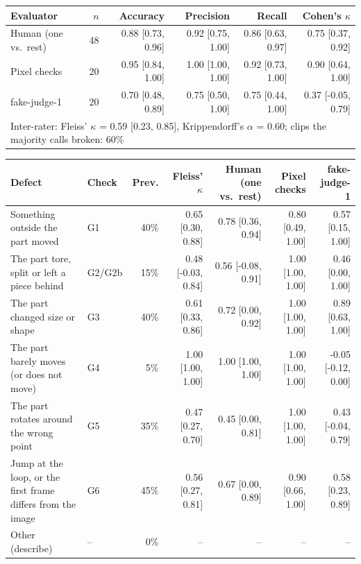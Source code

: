 \begin{tabular}{lrrrrr}
\toprule
Evaluator & $n$ & Accuracy & Precision & Recall & Cohen's $\kappa$ \\
\midrule
Human (one vs.\ rest) & 48 & 0.88 {\scriptsize[0.73, 0.96]} & 0.92 {\scriptsize[0.75, 1.00]} & 0.86 {\scriptsize[0.63, 0.97]} & 0.75 {\scriptsize[0.37, 0.92]} \\
Pixel checks & 20 & 0.95 {\scriptsize[0.84, 1.00]} & 1.00 {\scriptsize[1.00, 1.00]} & 0.92 {\scriptsize[0.73, 1.00]} & 0.90 {\scriptsize[0.64, 1.00]} \\
fake-judge-1 & 20 & 0.70 {\scriptsize[0.48, 0.89]} & 0.75 {\scriptsize[0.50, 1.00]} & 0.75 {\scriptsize[0.44, 1.00]} & 0.37 {\scriptsize[-0.05, 0.79]} \\
\midrule
\multicolumn{6}{l}{\footnotesize Inter-rater: Fleiss' $\kappa$ = 0.59 {\scriptsize[0.23, 0.85]}, Krippendorff's $\alpha$ = 0.60; clips the majority calls broken: 60\%} \\
\bottomrule
\end{tabular}

\begin{tabular}{llrrrrr}
\toprule
Defect & Check & Prev. & Fleiss' $\kappa$ & Human (one vs.\ rest) & Pixel checks & fake-judge-1 \\
\midrule
Something outside the part moved & G1 & 40\% & 0.65 {\scriptsize[0.30, 0.88]} & 0.78 {\scriptsize[0.36, 0.94]} & 0.80 {\scriptsize[0.49, 1.00]} & 0.57 {\scriptsize[0.15, 1.00]} \\
The part tore, split or left a piece behind & G2/G2b & 15\% & 0.48 {\scriptsize[-0.03, 0.84]} & 0.56 {\scriptsize[-0.08, 0.91]} & 1.00 {\scriptsize[1.00, 1.00]} & 0.46 {\scriptsize[0.00, 1.00]} \\
The part changed size or shape & G3 & 40\% & 0.61 {\scriptsize[0.33, 0.86]} & 0.72 {\scriptsize[0.00, 0.92]} & 1.00 {\scriptsize[1.00, 1.00]} & 0.89 {\scriptsize[0.63, 1.00]} \\
The part barely moves (or does not move) & G4 & 5\% & 1.00 {\scriptsize[1.00, 1.00]} & 1.00 {\scriptsize[1.00, 1.00]} & 1.00 {\scriptsize[1.00, 1.00]} & -0.05 {\scriptsize[-0.12, 0.00]} \\
The part rotates around the wrong point & G5 & 35\% & 0.47 {\scriptsize[0.27, 0.70]} & 0.45 {\scriptsize[0.00, 0.81]} & 1.00 {\scriptsize[1.00, 1.00]} & 0.43 {\scriptsize[-0.04, 0.79]} \\
Jump at the loop, or the first frame differs from the image & G6 & 45\% & 0.56 {\scriptsize[0.27, 0.81]} & 0.67 {\scriptsize[0.00, 0.89]} & 0.90 {\scriptsize[0.66, 1.00]} & 0.58 {\scriptsize[0.23, 0.89]} \\
Other (describe) & -- & 0\% & -- & -- & -- & -- \\
\bottomrule
\end{tabular}
